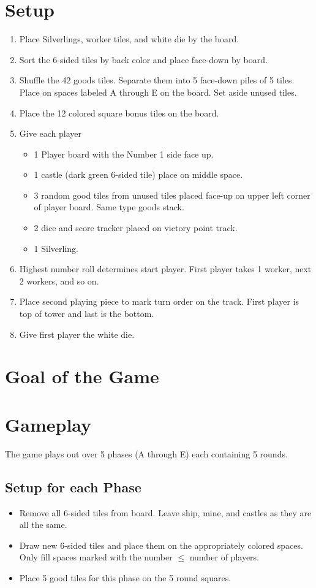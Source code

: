 \documentclass[12pt]{article}
\newenvironment{enumerateCustom}
{\begin{enumerate}
  \setlength{\itemsep}{1pt}
  \setlength{\parskip}{0pt}
  \setlength{\parsep}{0pt}}
{\end{enumerate}}
\newenvironment{itemizeCustom}
{\begin{itemize}
  \setlength{\itemsep}{1pt}
  \setlength{\parskip}{0pt}
  \setlength{\parsep}{0pt}}
{\end{itemize}}
\begin{document}
\begin{mdframed}[style = customFrame]
\begin{multicols*}{2}

\section*{Setup}
\begin{enumerateCustom}
	\item Place Silverlings, worker tiles, and white die by the board.
	\item Sort the 6-sided tiles by back color and place face-down by board.
	\item Shuffle the 42 goods tiles. Separate them into 5 face-down piles of 5 tiles. Place on spaces labeled A through E on the board. Set aside unused tiles.
	\item Place the 12 colored square bonus tiles on the board.
	\item Give each player
		\begin{itemizeCustom}
			\item 1 Player board with the Number 1 side face up.
			\item 1 castle (dark green 6-sided tile) place on middle space.
			\item 3 random good tiles from unused tiles placed face-up on upper left corner of player board. Same type goods stack.
			\item 2 dice and score tracker placed on victory point track.
			\item 1 Silverling.
		\end{itemizeCustom}
	\item Highest number roll determines start player. First player takes 1 worker, next 2 workers, and so on. 
	\item Place second playing piece to mark turn order on the track. First player is top of tower and last is the bottom.
	\item Give first player the white die.
\end{enumerateCustom}
\section*{Goal of the Game}
\section*{Gameplay}
The game plays out over 5 phases (A through E) each containing 5 rounds.
\subsection*{Setup for each Phase}
\begin{itemizeCustom}
	\item Remove all 6-sided tiles from board. Leave ship, mine, and castles as they are all the same.
	\item Draw new 6-sided tiles and place them on the appropriately colored spaces. Only fill spaces marked with the number $\le$ number of players.
	\item Place 5 good tiles for this phase on the 5 round squares.
\end{itemizeCustom}


\end{multicols*}
\end{mdframed}
\end{document}

